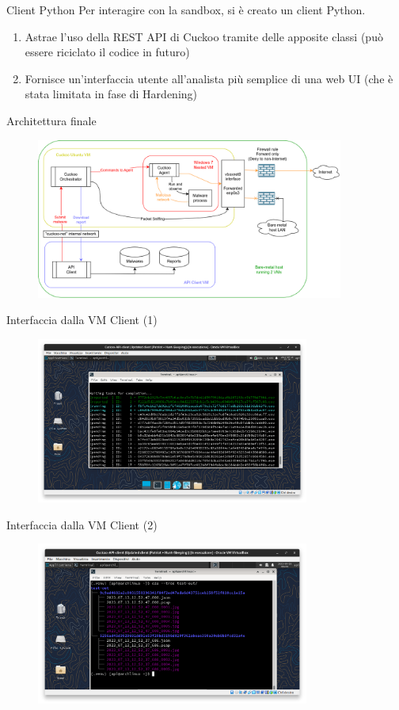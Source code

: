 \begin{frame}{Client Python}
Per interagire con la sandbox, si è creato un client Python.

\begin{enumerate}
    \item Astrae l'uso della REST API di Cuckoo tramite delle apposite classi (può essere riciclato il codice in futuro)
    \item Fornisce un'interfaccia utente all'analista più semplice di una web UI (che è stata limitata in fase di Hardening)
\end{enumerate}
\end{frame}

\begin{frame}{Architettura finale}
\begin{figure}
    \centering
    \includegraphics[width=0.9\textwidth]{images/cuckoo_vms.png}
\end{figure}
\end{frame}

\begin{frame}{Interfaccia dalla VM Client (1)}
\begin{figure}
    \centering
    \includegraphics[width=0.8\textwidth]{images/dynamic-api-client-running.png}
\end{figure}
\end{frame}

\begin{frame}{Interfaccia dalla VM Client (2)}
\begin{figure}
    \centering
    \includegraphics[width=0.8\textwidth]{images/dynamic-api-results.png}
\end{figure}
\end{frame}